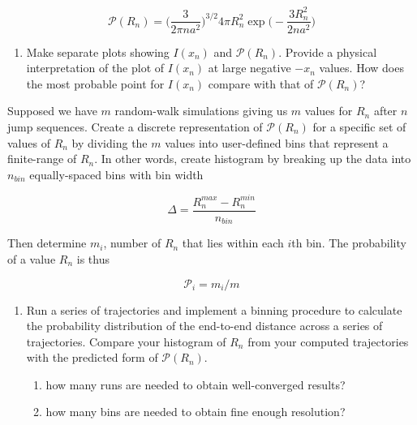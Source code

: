 \documentclass[11pt]{article}
\providecommand{\tightlist}{%
      \setlength{\itemsep}{0pt}\setlength{\parskip}{0pt}}
\begin{document}
\begin{equation}
\mathcal{P}(R_n) = \Big(\frac{3}{2\pi n a^2}\Big)^{3/2} 4\pi R_n^2 \exp\Big(-\frac{3R_n^2}{2n a^2}\Big)    
\end{equation}


\begin{enumerate}
\def\labelenumi{\arabic{enumi}.}
\setcounter{enumi}{4}
\tightlist
\item
  Make separate plots showing $I(x_n)$ and $\mathcal{P}(R_n)$.
  Provide a physical interpretation of the plot of $I(x_n)$ at large
  negative $-x_n$ values. How does the most probable point for
  $I(x_n)$ compare with that of $\mathcal{P}(R_n)$?
\end{enumerate}

Supposed we have $m$ random-walk simulations giving us $m$ values
for $R_n$ after $n$ jump sequences. Create a discrete representation
of $\mathcal{P}(R_n)$ for a specific set of values of $R_n$ by
dividing the $m$ values into user-defined bins that represent a
finite-range of $R_n$. In other words, create histogram by breaking up
the data into $n_{bin}$ equally-spaced bins with bin width

\begin{equation}
\Delta = \frac{R_n^{max} - R_n^{min}}{n_{bin}}    
\end{equation}


Then determine $m_i$, number of $R_n$ that lies within each $i$th
bin. The probability of a value $R_n$ is thus

\begin{equation}
\mathcal{P}_i = m_i/m
\end{equation}

\begin{enumerate}
\def\labelenumi{\arabic{enumi}.}
\setcounter{enumi}{5}
\tightlist
\item
  Run a series of trajectories and implement a binning procedure to
  calculate the probability distribution of the end-to-end distance
  across a series of trajectories. Compare your histogram of $R_n$
  from your computed trajectories with the predicted form of
  $\mathcal{P}(R_n)$.

  \begin{enumerate}
  \def\labelenumii{\alph{enumii}.}
  \tightlist
  \item
    how many runs are needed to obtain well-converged results?
  \item
    how many bins are needed to obtain fine enough resolution?
  \end{enumerate}
\end{enumerate}


    
    
    
\end{document}
